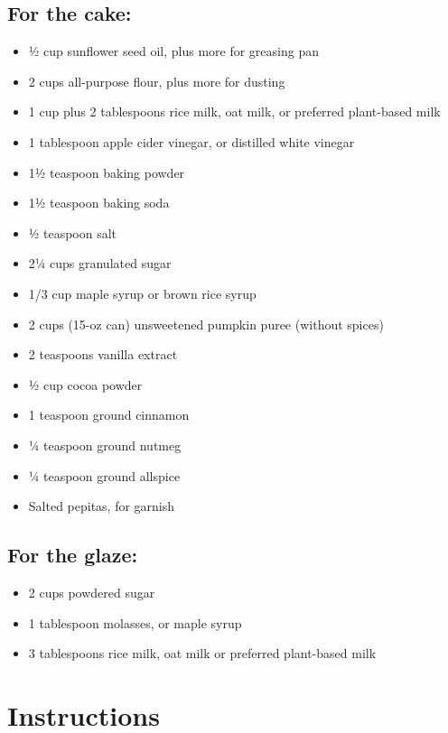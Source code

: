 \documentclass[12pt]{article}
\begin{document}
\begin{multicols}{2}
\subsection{For the cake:}
\begin{itemize}
    \item ½ cup sunflower seed oil, plus more for greasing pan
    \item 2 cups all-purpose flour, plus more for dusting
    \item 1 cup plus 2 tablespoons rice milk, oat milk, or preferred plant-based milk
    \item 1 tablespoon apple cider vinegar, or distilled white vinegar
    \item 1½ teaspoon baking powder
    \item 1½ teaspoon baking soda
    \item ½ teaspoon salt
    \item 2¼ cups granulated sugar
    \item 1/3 cup maple syrup or brown rice syrup
    \item 2 cups (15-oz can) unsweetened pumpkin puree (without spices)
    \item 2 teaspoons vanilla extract
    \item ½ cup cocoa powder
    \item 1 teaspoon ground cinnamon
    \item ¼ teaspoon ground nutmeg
    \item ¼ teaspoon ground allspice
    \item Salted pepitas, for garnish
\end{itemize}

\subsection{For the glaze:}
\begin{itemize}
    \item 2 cups powdered sugar
    \item 1 tablespoon molasses, or maple syrup
    \item 3 tablespoons rice milk, oat milk or preferred plant-based milk
\end{itemize}
\end{multicols}

\newpage

\section{Instructions}
\end{document}
